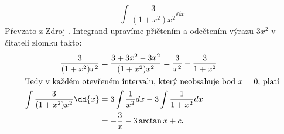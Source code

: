 \begin{mdframed}[style=mdexam]
  \begin{example}\label{MAI:exam130}
    \begin{equation}\label{MA:int_ex_02}
      \int\frac{3}{(1+x^2)x^2}\dd{x}
    \end{equation}
    Převzato z Zdroj \cite[s.~29]{Knichal}. Integrand upravíme přičtením a odečtením výrazu $3x^2$ v
    čitateli zlomku takto:
    \begin{align*}
      \frac{3}{(1+x^2)x^2} 
        &= \frac{3+3x^2-3x^2}{(1+x^2)x^2} = \frac{3}{x^2}-\frac{3}{1+x^2}                      \\  
      \intertext{Tedy v každém otevřeném intervalu, který neobsahuje bod \(x=0\), platí}
      \int{\frac{3}{(1+x^2)x^2}\dd{x}} 
        &= 3\int{\frac{1}{x^2}dx} - 3\int{\frac{1}{1+x^2}dx}                                   \\
        &= -\frac{3}{x}-3\arctan x + c. 
    \end{align*}
  \end{example}
\end{mdframed}